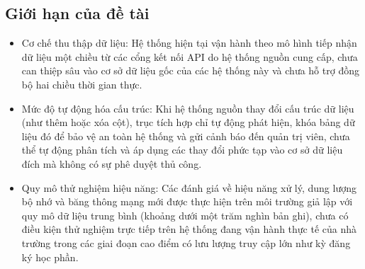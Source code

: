 \subsection{Giới hạn của đề tài}
\begin{itemize}
  \item Cơ chế thu thập dữ liệu: Hệ thống hiện tại vận hành theo mô hình tiếp nhận dữ liệu một chiều từ các cổng kết nối API do hệ thống nguồn cung cấp, chưa can thiệp sâu vào cơ sở dữ liệu gốc của các hệ thống này và chưa hỗ trợ đồng bộ hai chiều thời gian thực.
  \item Mức độ tự động hóa cấu trúc: Khi hệ thống nguồn thay đổi cấu trúc dữ liệu (như thêm hoặc xóa cột), trục tích hợp chỉ tự động phát hiện, khóa bảng dữ liệu đó để bảo vệ an toàn hệ thống và gửi cảnh báo đến quản trị viên, chưa thể tự động phân tích và áp dụng các thay đổi phức tạp vào cơ sở dữ liệu đích mà không có sự phê duyệt thủ công.
  \item Quy mô thử nghiệm hiệu năng: Các đánh giá về hiệu năng xử lý, dung lượng bộ nhớ và băng thông mạng mới được thực hiện trên môi trường giả lập với quy mô dữ liệu trung bình (khoảng dưới một trăm nghìn bản ghi), chưa có điều kiện thử nghiệm trực tiếp trên hệ thống đang vận hành thực tế của nhà trường trong các giai đoạn cao điểm có lưu lượng truy cập lớn như kỳ đăng ký học phần.
\end{itemize}